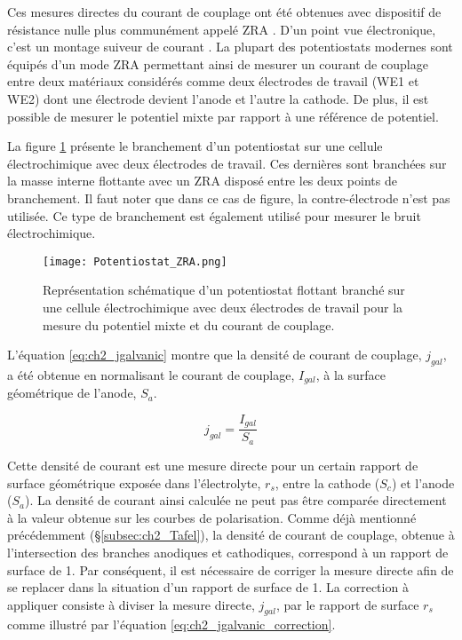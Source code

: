 \begin{refsection}
    Ces mesures directes du courant de couplage ont été obtenues avec dispositif de résistance nulle plus communément appelé ZRA
    \citep{Gabrielli2015}. D'un
    point vue électronique, c'est un montage suiveur de courant \citep{Bard2001}. La plupart des potentiostats modernes
    sont équipés d'un mode ZRA permettant ainsi de mesurer un courant de couplage entre deux matériaux 
    considérés comme deux électrodes de travail (WE1 et WE2) dont une électrode devient l'anode et l'autre la cathode.
    De plus, il est possible de mesurer le potentiel mixte par rapport à une référence de potentiel.

    La figure \ref{fig:ch2_potentiostat_ZRA} présente le branchement d'un potentiostat sur une cellule électrochimique
    avec deux électrodes de travail. Ces dernières sont branchées sur la masse interne flottante avec un ZRA disposé entre
    les deux points de branchement. Il faut noter que dans ce cas de figure, la contre-électrode n'est pas utilisée. 
    Ce type de branchement est également utilisé pour mesurer le bruit électrochimique.

    \begin{figure}[!htb]
        \centering
            \texttt{[image: Potentiostat\_ZRA.png]}
        \caption{Représentation schématique d'un potentiostat flottant branché sur une cellule électrochimique avec deux
        électrodes de travail pour la mesure du potentiel mixte et du courant de couplage.}
        \label{fig:ch2_potentiostat_ZRA}
    \end{figure}

    L'équation \ref{eq:ch2_jgalvanic} montre que la densité de courant de couplage, $j_{gal}$, 
    a été obtenue en normalisant le courant de couplage, $I_{gal}$, à la surface géométrique de
    l'anode, $S_a$. 
        
    \begin{equation}
        j_{gal} = \frac{I_{gal}}{S_{a}}
    \label{eq:ch2_jgalvanic}
    \end{equation}

    Cette densité de courant est une mesure directe pour un certain rapport de surface géométrique exposée dans
    l'électrolyte, $r_s$, entre la cathode ($S_c$) et l'anode ($S_a$). 
    La densité de courant ainsi calculée ne peut pas être comparée
    directement à la valeur obtenue sur les courbes de polarisation.
    Comme déjà mentionné précédemment (\S\ref{subsec:ch2_Tafel}), la densité de courant de couplage, obtenue à
    l'intersection des branches anodiques et cathodiques, correspond à un rapport de surface de 1. Par conséquent, il
    est nécessaire de corriger la mesure directe afin de se replacer dans la situation d'un rapport de surface de 1. 
    La correction à appliquer consiste à diviser la mesure directe, $j_{gal}$, par le rapport de surface $r_s$ comme
    illustré par l'équation \ref{eq:ch2_jgalvanic_correction}.


\end{refsection}
